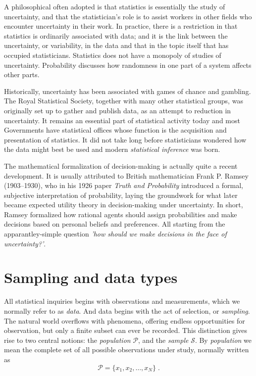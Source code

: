 \documentclass{book}
\begin{document}
\medskip

A philosophical often adopted is that statistics is essentially the study of uncertainty, and that the statistician's role is to assist workers in other fields who encounter uncertainty in their work. In practice, there is a restriction in that statistics is ordinarily associated with data; and it is the link between the uncertainty, or variability, in the data and that in the topic itself that has occupied statisticians. Statistics does not have a monopoly of studies of uncertainty. Probability discusses how randomness in one part of a system affects other parts.

\medskip

Historically, uncertainty has been associated with games of chance and gambling. The Royal Statistical Society, together with many other statistical groups, was originally set up
to gather and publish data, as an attempt to reduction in uncertainty. It remains an essential part of statistical activity today and most Governments have statistical offices whose function is the acquisition and presentation of statistics. It did not take long before statisticians wondered how the data might best be used and modern \textit{statistical inference} was born.

\medskip

The mathematical formalization of decision-making is actually quite a recent development. It is usually attributed to British mathematician Frank P. Ramsey (1903–1930), who in his 1926 paper \textit{Truth and Probability} \cite{ramsey1926} introduced a formal, subjective interpretation of probability, laying the groundwork for what later became expected utility theory in decision-making under uncertainty. In short, Ramsey formalized how rational agents should assign probabilities and make decisions based on personal beliefs and preferences. All starting from the apparantley-simple question \textit{'how should we make decisions in the face of uncertainty?'}.\\

\section{Sampling and data types}
 
All statistical inquiries begins with observations and measurements, which we normally refer to as \textit{data}. And data begins with the act of selection, or \textit{sampling}. The natural world overflows with phenomena, offering endless opportunities for observation, but only a finite subset can ever be recorded. This distinction gives rise to two central notions: the \textit{population} $\mathcal{P}$, and the \textit{sample} $\mathcal{S}$. By \textit{population} we mean the complete set of all possible observations under study, normally written as 
\begin{equation}
	\mathcal{P} = \{x_1, x_2, \dots, x_N\} \; .
\end{equation}
\end{document}
